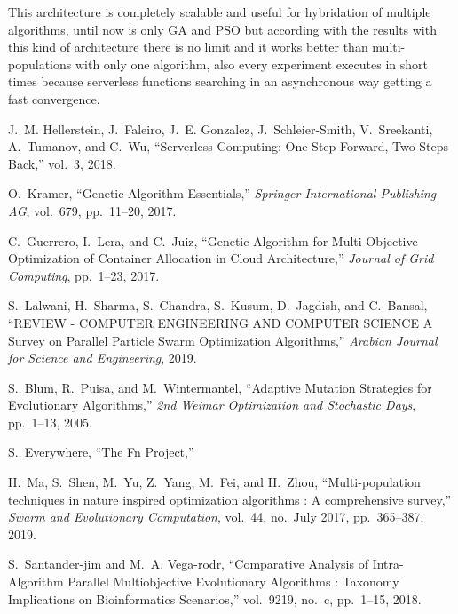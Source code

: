 \documentclass[runningheads]{llncs}
\begin{document}
This architecture is completely scalable and useful for hybridation of multiple algorithms,
until now is only GA and PSO but according with the results with this kind of architecture
there is no limit and it works better than multi-populations with only one algorithm, also
every experiment executes in short times because serverless functions searching in an asynchronous way getting a fast convergence.
   \begin{thebibliography}{10}

    J.~M. Hellerstein, J.~Faleiro, J.~E. Gonzalez, J.~Schleier-Smith, V.~Sreekanti,
      A.~Tumanov, and C.~Wu, ``{Serverless Computing: One Step Forward, Two Steps
      Back},'' vol.~3, 2018.
    
    O.~Kramer, ``{Genetic Algorithm Essentials},'' {\em Springer International
      Publishing AG}, vol.~679, pp.~11--20, 2017.
    
    C.~Guerrero, I.~Lera, and C.~Juiz, ``{Genetic Algorithm for Multi-Objective
      Optimization of Container Allocation in Cloud Architecture},'' {\em Journal
      of Grid Computing}, pp.~1--23, 2017.
    
    S.~Lalwani, H.~Sharma, S.~Chandra, S.~Kusum, D.~Jagdish, and C.~Bansal,
      ``{REVIEW - COMPUTER ENGINEERING AND COMPUTER SCIENCE A Survey on Parallel
      Particle Swarm Optimization Algorithms},'' {\em Arabian Journal for Science
      and Engineering}, 2019.
    
    S.~Blum, R.~Puisa, and M.~Wintermantel, ``{Adaptive Mutation Strategies for
      Evolutionary Algorithms},'' {\em 2nd Weimar Optimization and Stochastic
      Days}, pp.~1--13, 2005.
    
    S.~Everywhere, ``{The Fn Project},''
    
    H.~Ma, S.~Shen, M.~Yu, Z.~Yang, M.~Fei, and H.~Zhou, ``{Multi-population
      techniques in nature inspired optimization algorithms : A comprehensive
      survey},'' {\em Swarm and Evolutionary Computation}, vol.~44, no.~July 2017,
      pp.~365--387, 2019.
    
    S.~Santander-jim and M.~A. Vega-rodr, ``{Comparative Analysis of
      Intra-Algorithm Parallel Multiobjective Evolutionary Algorithms : Taxonomy
      Implications on Bioinformatics Scenarios},'' vol.~9219, no.~c, pp.~1--15,
      2018.
    

\end{thebibliography}
\end{document}
